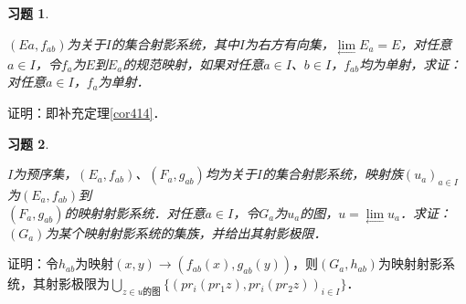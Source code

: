 \documentclass[12pt, a4paper, oneside]{book}
\newtheorem{exer}{习题}
\begin{document}
			\begin{exer}\label{exer190}
				\hfill\par
				$(Ea, f_{ab})$为关于$I$的集合射影系统，其中$I$为右方有向集，$\lim\limits_\gets E_a=E$，对任意$a\in I$，令$f_a$为$E$到$E_a$的规范映射，如果对任意$a\in I$、$b\in I$，$f_{ab}$均为单射，求证：对任意$a\in I$，$f_a$为单射．
			\end{exer}
			证明：即补充定理\ref{cor414}．
			
			\begin{exer}\label{exer191}
				\hfill\par
				$I$为预序集，$(E_a, f_{ab})$、$(F_a, g_{ab})$均为关于$I$的集合射影系统，映射族$(u_a)_{a\in I}$为$(E_a, f_{ab})$到\\$(F_a, g_{ab})$的映射射影系统．对任意$a\in I$，令$G_a$为$u_a$的图，$u=\lim\limits_\gets u_a$．求证：$(G_a)$为某个映射射影系统的集族，并给出其射影极限．
			\end{exer}
			证明：令$h_{ab}$为映射$(x, y)\to (f_{ab}(x), g_{ab}(y))$，则$(G_a, h_{ab})$为映射射影系统，其射影极限为$\bigcup\limits_{z\in u\text{的图}}\{(pr_i(pr_1z), pr_i(pr_2z))_{i\in I}\}$．
			
\end{document}
